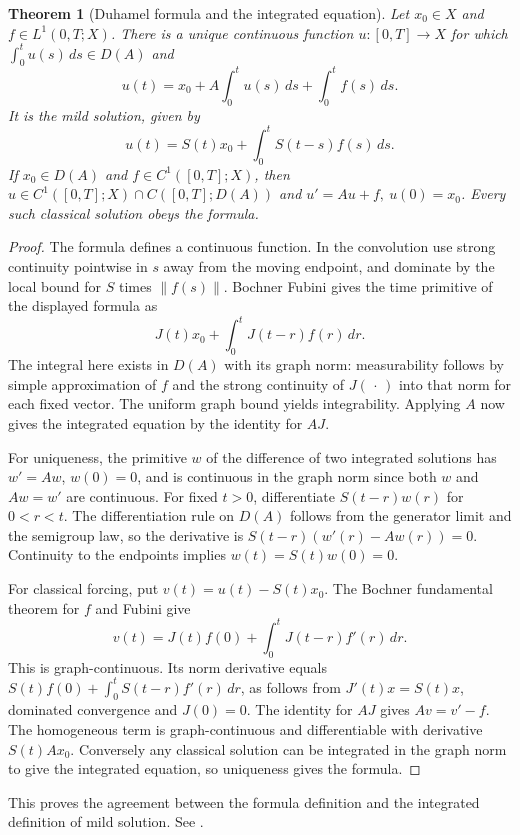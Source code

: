 \documentclass[11pt,oneside,openany]{book}
\theoremstyle{plain}
\newtheorem{theorem}{Theorem}[chapter]
\theoremstyle{definition}
\theoremstyle{remark}
\begin{document}
\begin{theorem}[Duhamel formula and the integrated equation]
\label{thm:pde-duhamel}
Let \(x_0\in X\) and \(f\in L^1(0,T;X)\).
There is a unique continuous function \(u:[0,T]\to X\) for which
\(\int_0^t u(s)\,ds\in D(A)\) and
\[
 u(t)=x_0+A\int_0^t u(s)\,ds+\int_0^t f(s)\,ds.
\]
It is the mild solution, given by
\[
 u(t)=S(t)x_0+\int_0^t S(t-s)f(s)\,ds .
\]
If \(x_0\in D(A)\) and \(f\in C^1([0,T];X)\), then
\(u\in C^1([0,T];X)\cap C([0,T];D(A))\) and
\(u'=Au+f,\ u(0)=x_0\). Every such classical solution obeys the formula.
\end{theorem}
\begin{proof}
The formula defines a continuous function. In the convolution use
strong continuity pointwise in \(s\) away from the moving endpoint,
and dominate by the local bound for \(S\) times \(\|f(s)\|\).
Bochner Fubini gives the time primitive of the displayed formula as
\[
 J(t)x_0+\int_0^t J(t-r)f(r)\,dr .
\]
The integral here exists in \(D(A)\) with its graph norm:
measurability follows by simple approximation of \(f\) and the
strong continuity of \(J(\,\cdot\,)\) into that norm for each
fixed vector. The uniform graph bound yields integrability.
Applying \(A\) now gives the integrated equation by the identity
for \(AJ\).

For uniqueness, the primitive \(w\) of the difference of two
integrated solutions has \(w'=Aw\), \(w(0)=0\), and is continuous
in the graph norm since both \(w\) and \(Aw=w'\) are continuous.
For fixed \(t>0\), differentiate \(S(t-r)w(r)\) for \(0<r<t\).
The differentiation rule on \(D(A)\) follows from the generator
limit and the semigroup law, so the derivative is
\(S(t-r)(w'(r)-Aw(r))=0\).
Continuity to the endpoints implies \(w(t)=S(t)w(0)=0\).

For classical forcing, put \(v(t)=u(t)-S(t)x_0\).
The Bochner fundamental theorem for \(f\) and Fubini give
\[
 v(t)=J(t)f(0)+\int_0^t J(t-r)f'(r)\,dr .
\]
This is graph-continuous. Its norm derivative equals
\(S(t)f(0)+\int_0^t S(t-r)f'(r)\,dr\), as follows from
\(J'(t)x=S(t)x\), dominated convergence and \(J(0)=0\).
The identity for \(AJ\) gives \(Av=v'-f\).
The homogeneous term is graph-continuous and differentiable
with derivative \(S(t)Ax_0\). Conversely any classical solution
can be integrated in the graph norm to give the integrated
equation, so uniqueness gives the formula.
\end{proof}

This proves the agreement between the formula definition and the
integrated definition of mild solution. See
\cite[Chapter VI, Section 7]{EngelNagel}.
\end{document}
